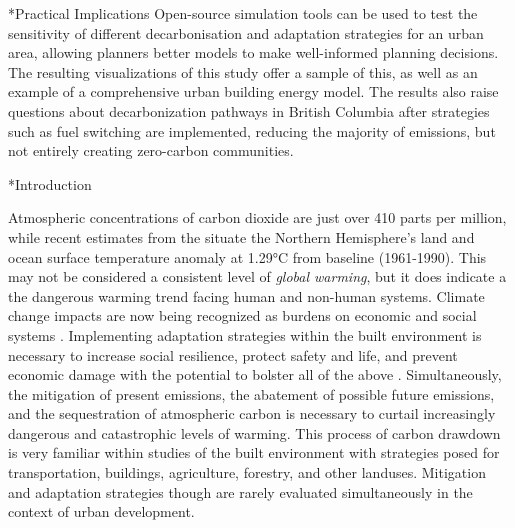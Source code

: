 \documentclass[twocolumn, a4paper,10pt]{article}
\makeatletter
\renewcommand\section{\@startsection{section}{1}{\z@}{3pt}{3pt}{\normalfont\large\bfseries}}
\makeatother
\begin{document}
\section*{Practical Implications}
Open-source simulation tools can be used to test the sensitivity of different decarbonisation and adaptation strategies for an urban area, allowing planners better models to make well-informed planning decisions. The resulting visualizations of this study offer a sample of this, as well as an example of a comprehensive urban building energy model. The results also raise questions about decarbonization pathways in British Columbia after strategies such as fuel switching are implemented, reducing the majority of emissions, but not entirely creating zero-carbon communities. 

\section*{Introduction}

Atmospheric concentrations of carbon dioxide are just over 410 parts per million, while recent estimates from the \citet{noauthor_state_2020} situate the Northern Hemisphere’s land and ocean surface temperature anomaly at 1.29°C from baseline (1961-1990). This may not be considered a consistent level of \textit{global warming}, but it does indicate a the dangerous warming trend facing human and non-human systems. Climate change impacts are now being recognized as burdens on economic and social systems \citep{frame_climate_2020}. Implementing adaptation strategies within the built environment is necessary to increase social resilience, protect safety and life, and prevent economic damage with the potential to bolster all of the above \citep{schunemann_mitigation_2020}. Simultaneously, the mitigation of present emissions, the abatement of possible future emissions, and the sequestration of atmospheric carbon is necessary to curtail increasingly dangerous and catastrophic levels of warming. This process of carbon drawdown is very familiar within studies of the built environment with strategies posed for transportation, buildings, agriculture, forestry, and other landuses. Mitigation and adaptation strategies though are rarely evaluated simultaneously in the context of urban development.
\end{document}
